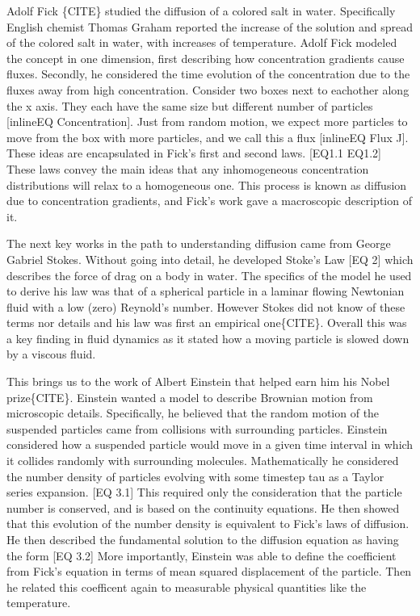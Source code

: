 \documentclass[draft, english]{volcanica-template}
\begin{document}
Adolf Fick \{CITE\} studied the diffusion of a colored salt in water. Specifically English chemist Thomas Graham reported the increase of the solution and spread of the colored salt in water, with increases of temperature. Adolf Fick modeled the concept in one dimension, first describing how concentration gradients cause fluxes. Secondly, he considered the time evolution of the concentration due to the fluxes away from high concentration. Consider two boxes next to eachother along the x axis. They each have the same size but different number of particles [inlineEQ Concentration]. Just from random motion, we expect more particles to move from the box with more particles, and we call this a flux [inlineEQ Flux J]. These ideas are encapsulated in Fick's first and second laws.
[EQ1.1 EQ1.2]
These laws convey the main ideas that any inhomogeneous concentration distributions will relax to a homogeneous one. This process is known as diffusion due to concentration gradients, and Fick's work gave a macroscopic description of it.

The next key works in the path to understanding diffusion came from George Gabriel Stokes. Without going into detail, he developed Stoke's Law
[EQ 2]
which describes the force of drag on a body in water. The specifics of the model he used to derive his law was that of a spherical particle in a laminar flowing Newtonian fluid with a low (zero) Reynold's number. However Stokes did not know of these terms nor details and his law was first an empirical one\{CITE\}. Overall this was a key finding in fluid dynamics as it stated how a moving particle is slowed down by a viscous fluid.

This brings us to the work of Albert Einstein that helped earn him his Nobel prize\{CITE\}. Einstein wanted a model to describe Brownian motion from microscopic details. Specifically, he believed that the random motion of the suspended particles came from collisions with surrounding particles. Einstein considered how a suspended particle would move in a given time interval in which it collides randomly with surrounding molecules. Mathematically he considered the number density of particles evolving with some timestep tau as a Taylor series expansion.
[EQ 3.1]
This required only the consideration that the particle number is conserved, and is based on the continuity equations. He then showed that this evolution of the number density is equivalent to Fick's laws of diffusion. He then described the fundamental solution to the diffusion equation as having the form
[EQ 3.2]
More importantly, Einstein was able to define the coefficient from Fick's equation in terms of mean squared displacement of the particle. Then he related this coefficent again to measurable physical quantities like the temperature.
\end{document}
